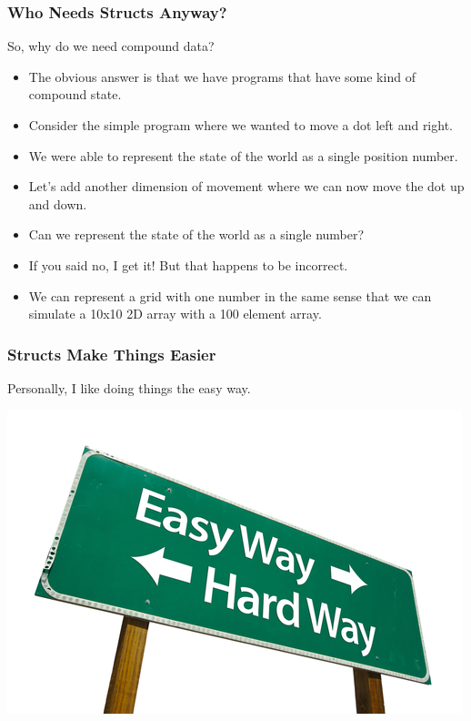 \documentclass{beamer}
\begin{document}
\begin{frame}
  \frametitle{Who Needs Structs Anyway?}
  So, why do we need compound data?
  \begin{itemize}
  \item<2-> The obvious answer is that we have programs that have some kind of compound state.
  \item<3-> Consider the simple program where we wanted to move a dot left and right.
  \item<4-> We were able to represent the state of the world as a single position number.
  \item<5-> Let's add another dimension of movement where we can now move the dot up and down.
  \item<6-> Can we represent the state of the world as a single number?
  \item<7-> If you said no, I get it! But that happens to be incorrect.
  \item<8-> We can represent a grid  with one number in the same sense that we can simulate a 10x10 2D array
    with a 100 element array.
  \end{itemize}
\end{frame}

\begin{frame}
  \frametitle{Structs Make Things Easier}
  Personally, I like doing things the easy way.
  \begin{center}
    \includegraphics{images/easy-way.jpg}
  \end{center}  
\end{frame}

\end{document}

